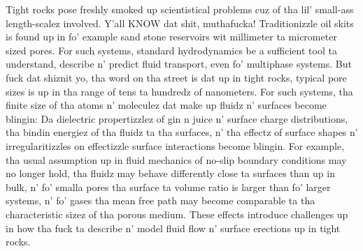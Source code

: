 Tight rocks pose freshly smoked up scientistical problems cuz of tha lil' small-ass length-scalez involved. Y'all KNOW dat shit, muthafucka! Traditionizzle oil skits is found up in fo' example sand stone reservoirs wit millimeter ta micrometer sized pores. For such systems, standard hydrodynamics be a sufficient tool ta understand, describe n' predict fluid transport, even fo' multiphase systems. But fuck dat shiznit yo, tha word on tha street is dat up in tight rocks, typical pore sizes is up in tha range of tens ta hundredz of nanometers. For such systems, tha finite size of tha atoms n' moleculez dat make up fluidz n' surfaces become blingin: Da dielectric propertizzlez of gin n juice n' surface charge distributions, tha bindin energiez of tha fluidz ta tha surfaces, n' tha effectz of surface shapes n' irregularitizzles on effectizzle surface interactions become blingin. For example, tha usual assumption up in fluid mechanics of no-slip boundary conditions may no longer hold, tha fluidz may behave differently close ta surfaces than up in bulk, n' fo' smalla pores tha surface ta volume ratio is larger than fo' larger systems, n' fo' gases tha mean free path may become comparable ta tha characteristic sizez of tha porous medium. These effects introduce challenges up in how tha fuck ta describe n' model fluid flow n' surface erections up in tight rocks.

